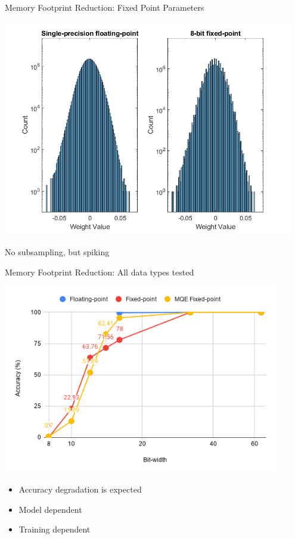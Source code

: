 \begin{frame}{Memory Footprint Reduction: Fixed Point Parameters}
	\begin{minipage}{0.6\textwidth}
		\centering
		\includegraphics[width=0.95\textwidth]{../Images/Weights-distributions/original-vs-fixed8/weight-distribution-FC1-MQE.png}\\
	\end{minipage}%
	\begin{minipage}{0.4\textwidth}
		\large No subsampling, but spiking\\
	\end{minipage}
\end{frame}

\begin{frame}{Memory Footprint Reduction: All data types tested}
	\begin{minipage}{0.6\textwidth}
		\centering
		\includegraphics[width=0.9\textwidth]{../Images/Weights-distributions/data-types-accuracy-chart.png}\\
	\end{minipage}%
	\begin{minipage}{0.4\textwidth}
		\begin{itemize}
			\item Accuracy degradation is expected
			\item Model dependent
			\item Training dependent
		\end{itemize}
	\end{minipage}
\end{frame}

